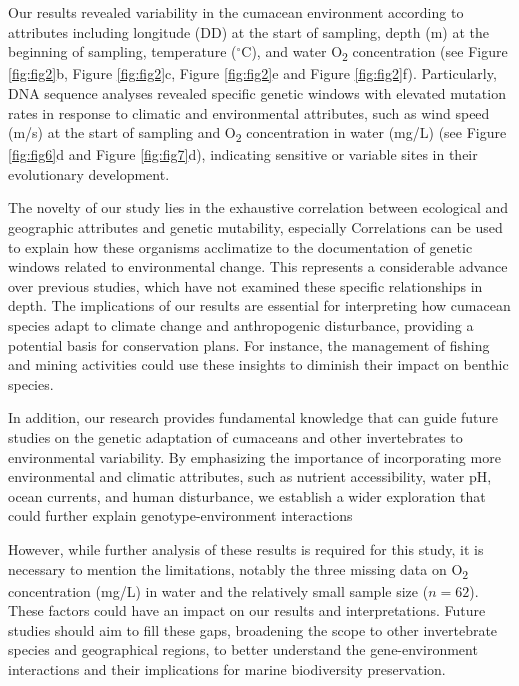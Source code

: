 Our results revealed variability in the cumacean environment according to attributes including longitude (DD) at the start of sampling, depth (m) at the beginning of sampling, temperature ($^\circ$C), and water O\textsubscript{2} concentration (see Figure \ref{fig:fig2}b, Figure \ref{fig:fig2}c, Figure \ref{fig:fig2}e and Figure \ref{fig:fig2}f). Particularly, DNA sequence analyses revealed specific genetic windows with elevated mutation rates in response to climatic and environmental attributes, such as wind speed (m/s) at the start of sampling and O\textsubscript{2} concentration in water (mg/L) (see Figure \ref{fig:fig6}d and Figure \ref{fig:fig7}d), indicating sensitive or variable sites in their evolutionary development.

The novelty of our study lies in the exhaustive correlation between ecological and geographic attributes and genetic mutability, especially  
Correlations can be used to explain how these organisms acclimatize to the documentation of genetic windows related to environmental change. This represents a considerable advance over previous studies, which have not examined these specific relationships in depth. The implications of our results are essential for interpreting how cumacean species adapt to climate change and anthropogenic disturbance, providing a potential basis for conservation plans. For instance, the management of fishing and mining activities could use these insights to diminish their impact on benthic species.

In addition, our research provides fundamental knowledge that can guide future studies on the genetic adaptation of cumaceans and other invertebrates to environmental variability. By emphasizing the importance of incorporating more environmental and climatic attributes, such as nutrient accessibility, water pH, ocean currents, and human disturbance, we establish a wider exploration that could further explain genotype-environment interactions

However, while further analysis of these results is required for this study, it is necessary to mention the limitations, notably the three missing data on O\textsubscript{2} concentration (mg/L) in water and the relatively small sample size ($n=62$). These factors could have an impact on our results and interpretations. Future studies should aim to fill these gaps, broadening the scope to other invertebrate species and geographical regions, to better understand the gene-environment interactions and their implications for marine biodiversity preservation.


